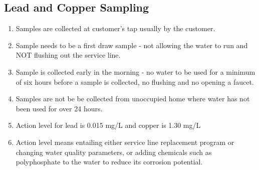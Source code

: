 \subsection{Lead and Copper Sampling}
\begin{enumerate}
\item Samples are collected at customer's tap usually by the customer.
\item Sample needs to be a first draw sample - not allowing the water to run and NOT flushing out the service line.
\item Sample is collected early in the morning - no water to be used for a minimum of six hours before a sample is collected, no flushing and no opening a faucet.
\item Samples are not be be collected from unoccupied home where water has not been used for over 24 hours.
\item Action level for lead is 0.015 mg/L and copper is 1.30 mg/L
\item Action level means entailing either service line replacement program or changing water quality parameters, or adding chemicals such as polyphosphate to the water to reduce its corrosion potential.
\end{enumerate}


